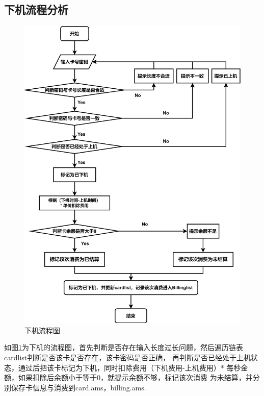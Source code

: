 \documentclass{article}
\begin{document}
    \subsection{下机流程分析}
    \begin{figure}[h]
        \centering
        \includegraphics[scale=0.11]{figure/settle_pic.png}
        \caption{下机流程图}
        \label{settle_pic}
    \end{figure}
    如图\ref{settle_pic}为下机的流程图，首先判断是否存在输入长度过长问题，然后遍历链表cardlist判断是否该卡是否存在，该卡密码是否正确，
    再判断是否已经处于上机状态，通过后把该卡标记为下机，同时扣除费用（下机费用-上机费用）* 每秒金额，如果扣除后余额小于等于0，就提示余额不够，标记该次消费
    为未结算，并分别保存卡信息与消费到card.ams，billing.ams.
    \newpage
\end{document}
